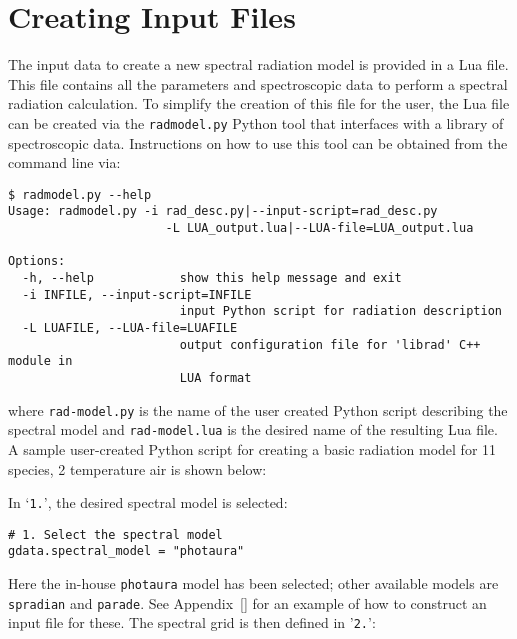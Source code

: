 \chapter{Creating Input Files}
\label{chap:input}

The input data to create a new spectral radiation model is provided in a Lua file.
This file contains all the parameters and spectroscopic data to perform a spectral radiation calculation.
To simplify the creation of this file for the user, the Lua file can be created via the \texttt{radmodel.py} Python tool that interfaces with a library of spectroscopic data.
Instructions on how to use this tool can be obtained from the command line via:

\begin{lstlisting}[basicstyle=\ttfamily\small]
$ radmodel.py --help
Usage: radmodel.py -i rad_desc.py|--input-script=rad_desc.py
                      -L LUA_output.lua|--LUA-file=LUA_output.lua

Options:
  -h, --help            show this help message and exit
  -i INFILE, --input-script=INFILE
                        input Python script for radiation description
  -L LUAFILE, --LUA-file=LUAFILE
                        output configuration file for 'librad' C++ module in
                        LUA format
\end{lstlisting}

\noindent where \texttt{rad-model.py} is the name of the user created Python script describing the spectral model and \texttt{rad-model.lua} is the desired name of the resulting Lua file.
A sample user-created Python script for creating a basic radiation model for 11 species, 2 temperature air is shown below:

\noindent \topbar

\bottombar

In `\texttt{1.}', the desired spectral model is selected:

\begin{lstlisting}[basicstyle=\ttfamily\small]
# 1. Select the spectral model
gdata.spectral_model = "photaura"
\end{lstlisting}

Here the in-house \texttt{photaura} model has been selected; other available models are \texttt{spradian} and \texttt{parade}.
See Appendix~\ref{} for an example of how to construct an input file for these.
The spectral grid is then defined in '\texttt{2.}':

